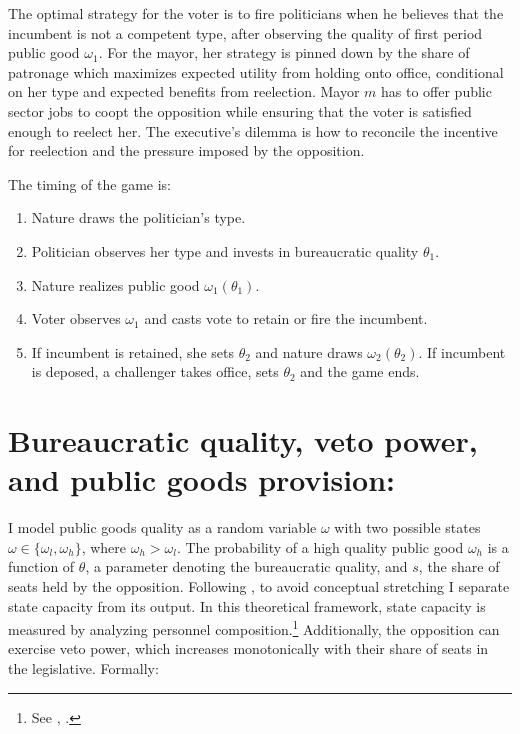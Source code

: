 \documentclass[12pt,]{book}
\providecommand{\tightlist}{%
  \setlength{\itemsep}{0pt}\setlength{\parskip}{0pt}}
\let\rmarkdownfootnote\footnote%
\def\footnote{\protect\rmarkdownfootnote}
\begin{document}
The optimal strategy for the voter is to fire politicians when he believes that the incumbent is not a competent type, after observing the quality of first period public good \(\omega_1\). For the mayor, her strategy is pinned down by the share of patronage which maximizes expected utility from holding onto office, conditional on her type and expected benefits from reelection. Mayor \(m\) has to offer public sector jobs to coopt the opposition while ensuring that the voter is satisfied enough to reelect her. The executive's dilemma is how to reconcile the incentive for reelection and the pressure imposed by the opposition.

The timing of the game is:

\begin{enumerate}
\def\labelenumi{\arabic{enumi})}
\tightlist
\item
  Nature draws the politician's type.
\item
  Politician observes her type and invests in bureaucratic quality \(\theta_1\).
\item
  Nature realizes public good \(\omega_1(\theta_1)\).
\item
  Voter observes \(\omega_1\) and casts vote to retain or fire the incumbent.
\item
  If incumbent is retained, she sets \(\theta_2\) and nature draws \(\omega_2(\theta_2)\). If incumbent is deposed, a challenger takes office, sets \(\theta_2\) and the game ends.
\end{enumerate}

\hypertarget{bureaucratic-quality-veto-power-and-public-goods-provision}{%
\section{Bureaucratic quality, veto power, and public goods provision:}\label{bureaucratic-quality-veto-power-and-public-goods-provision}}

I model public goods quality as a random variable \(\omega\) with two possible states \(\omega \in \{\omega_l, \omega_h\}\), where \(\omega_h>\omega_l\). The probability of a high quality public good \(\omega_h\) is a function of \(\theta\), a parameter denoting the bureaucratic quality, and \(s\), the share of seats held by the opposition. Following \citet{centeno_unpacking_2017}, to avoid conceptual stretching I separate state capacity from its output. In this theoretical framework, state capacity is measured by analyzing personnel composition.\footnote{See \citet{fukuyama_what_2013}, \citet{bersch_state_2017}.} Additionally, the opposition can exercise veto power, which increases monotonically with their share of seats in the legislative. Formally:
\end{document}
